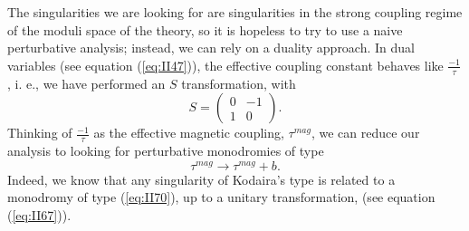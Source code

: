 The singularities we are looking for are singularities in the strong coupling 
regime of the moduli space of the theory, so it is hopeless to try to use 
a naive perturbative analysis; instead, we can rely on a duality approach. 
In dual variables (see equation (\ref{eq:II47})), the effective coupling constant 
behaves like $\frac {-1}{\tau}$, i. e., we have performed an $S$ transformation, 
with
\begin{equation}
	S= \left( \begin{array}{cc} 0 & -1  \\
			 1 & 0 
	\end{array} \right).
\label{eq:II69}
\end{equation}
Thinking of $\frac {-1}{\tau}$ as the effective magnetic coupling, 
$\tau^{mag}$, we can reduce our analysis to looking for perturbative 
monodromies of type
\begin{equation}
\tau^{mag} \rightarrow \tau^{mag} + b.
\label{eq:II70}
\end{equation}
Indeed, we know that any singularity of Kodaira's 
type is related to a monodromy of type (\ref{eq:II70}), up to a unitary 
transformation, (see equation (\ref{eq:II67})).
  
